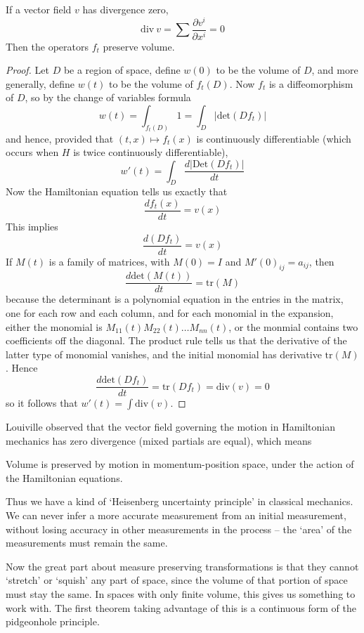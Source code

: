 \begin{lemma}
    If a vector field $v$ has divergence zero,
    \[ \text{div}\ v = \sum \frac{\partial v^i}{\partial x^i} = 0 \]
    Then the operators $f_t$ preserve volume.
\end{lemma}
\begin{proof}
    Let $D$ be a region of space, define $w(0)$ to be the volume of $D$, and more generally, define $w(t)$ to be the volume of $f_t(D)$. Now $f_t$ is a diffeomorphism of $D$, so by the change of variables formula
    \[ w(t) = \int_{f_t(D)} 1 = \int_{D} |\text{det} (Df_t) | \]
    and hence, provided that $(t,x) \mapsto f_t(x)$ is continuously differentiable (which occurs when $H$ is twice continuously differentiable),
    \[ w'(t) = \int_D \frac{d |\text{Det}(Df_t)|}{dt} \]
    Now the Hamiltonian equation tells us exactly that
    \[ \frac{df_t(x)}{dt} = v(x) \]
    This implies
    \[ \frac{d(Df_t)}{dt} = v(x) \]
    If $M(t)$ is a family of matrices, with $M(0) = I$ and $M'(0)_{ij} = a_{ij}$, then
    \[ \frac{d \text{det}(M(t))}{dt} = \text{tr}(M) \]
    because the determinant is a polynomial equation in the entries in the matrix, one for each row and each column, and for each monomial in the expansion, either the monomial is $M_{11}(t) M_{22}(t) \dots M_{nn}(t)$, or the monmial contains two coefficients off the diagonal. The product rule tells us that the derivative of the latter type of monomial vanishes, and the initial monomial has derivative $\text{tr}(M)$. Hence
    \[ \frac{d \text{det}(Df_t)}{dt} = \text{tr}(Df_t) = \text{div}(v) = 0 \]
    so it follows that $w'(t) = \int \text{div}(v)$.
\end{proof}

Louiville observed that the vector field governing the motion in Hamiltonian mechanics has zero divergence (mixed partials are equal), which means

\begin{theorem}
    Volume is preserved by motion in momentum-position space, under the action of the Hamiltonian equations.
\end{theorem}

Thus we have a kind of `Heisenberg uncertainty principle' in classical mechanics. We can never infer a more accurate measurement from an initial measurement, without losing accuracy in other measurements in the process -- the `area' of the measurements must remain the same.

Now the great part about measure preserving transformations is that they cannot `stretch' or `squish' any part of space, since the volume of that portion of space must stay the same. In spaces with only finite volume, this gives us something to work with. The first theorem taking advantage of this is a continuous form of the pidgeonhole principle.

